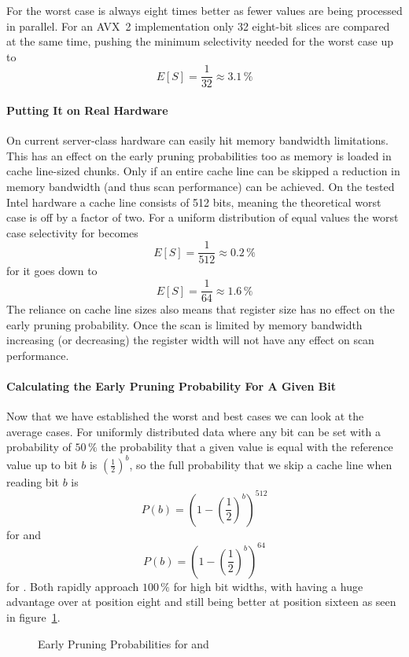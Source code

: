 For \bs{} the worst case is always eight times better as fewer values are being
processed in parallel. For an AVX~2 implementation only 32 eight-bit slices are
compared at the same time, pushing the minimum selectivity needed for the worst
case up to $$E[S]=\frac{1}{32}\approx 3.1\,\%$$

\paragraph{Putting It on Real Hardware}

On current server-class hardware \bwv{} can easily hit memory bandwidth
limitations. This has an effect on the early pruning probabilities too as
memory is loaded in cache line-sized chunks. Only if an entire cache line can
be skipped a reduction in memory bandwidth (and thus scan performance) can be
achieved. On the tested Intel hardware a cache line consists of 512 bits,
meaning the theoretical worst case is off by a factor of two. For a uniform
distribution of equal values the worst case selectivity for \bwv{} becomes
$$E[S]=\frac{1}{512}\approx 0.2\,\%$$ for \bs{} it goes down to
$$E[S]=\frac{1}{64}\approx 1.6\,\%$$ The reliance on cache line sizes also means
that register size has no effect on the early pruning probability. Once the
scan is limited by memory bandwidth increasing (or decreasing) the register
width will not have any effect on scan performance.

\paragraph{Calculating the Early Pruning Probability For A Given Bit}

Now that we have established the worst and best cases we can look at the
average cases. For uniformly distributed data where any bit can be set with a
probability of $50\,\%$ the probability that a given value is equal with the
reference value up to bit $b$ is ${\left(\frac{1}{2}\right)}^b$,
so the full probability that we skip a cache line when reading bit $b$ is
$$P(b)={\left(1-{\left(\frac{1}{2}\right)}^b\right)}^{512}$$
for \bwv{} and
$$P(b)={\left(1-{\left(\frac{1}{2}\right)}^b\right)}^{64}$$
for \bs{}. Both rapidly approach $100\,\%$ for high bit widths, with \bs{}
having a huge advantage over \bwv{} at position eight and still being better at
position sixteen as seen in figure~\ref{fig:earlypruningprobabilities}.

\begin{figure}[h] \center
{}
\caption{Early Pruning Probabilities for \bwv{} and \bs{}}
\label{fig:earlypruningprobabilities}
\end{figure}

